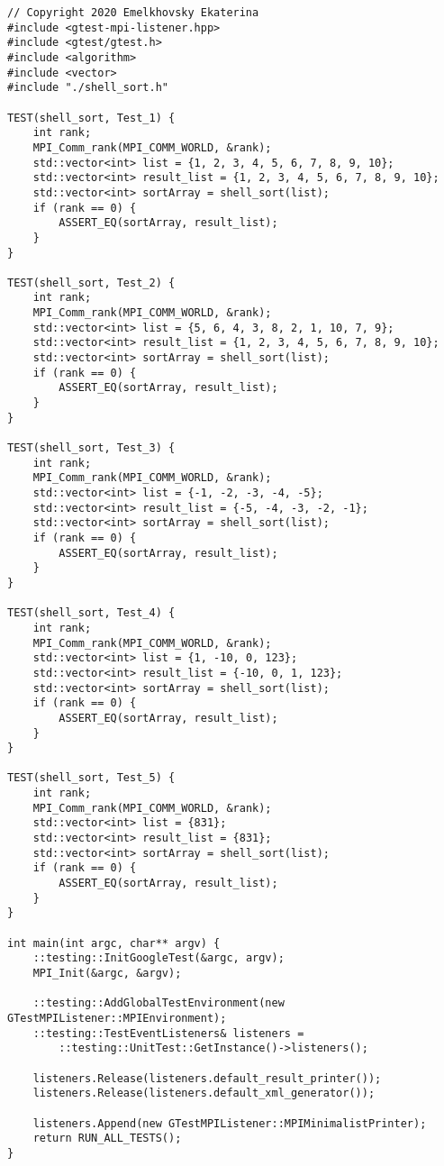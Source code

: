 \documentclass{report}
\begin{document}
\begin{lstlisting}
// Copyright 2020 Emelkhovsky Ekaterina
#include <gtest-mpi-listener.hpp>
#include <gtest/gtest.h>
#include <algorithm>
#include <vector>
#include "./shell_sort.h"

TEST(shell_sort, Test_1) {
    int rank;
    MPI_Comm_rank(MPI_COMM_WORLD, &rank);
    std::vector<int> list = {1, 2, 3, 4, 5, 6, 7, 8, 9, 10};
    std::vector<int> result_list = {1, 2, 3, 4, 5, 6, 7, 8, 9, 10};
    std::vector<int> sortArray = shell_sort(list);
    if (rank == 0) {
        ASSERT_EQ(sortArray, result_list);
    }
}

TEST(shell_sort, Test_2) {
    int rank;
    MPI_Comm_rank(MPI_COMM_WORLD, &rank);
    std::vector<int> list = {5, 6, 4, 3, 8, 2, 1, 10, 7, 9};
    std::vector<int> result_list = {1, 2, 3, 4, 5, 6, 7, 8, 9, 10};
    std::vector<int> sortArray = shell_sort(list);
    if (rank == 0) {
        ASSERT_EQ(sortArray, result_list);
    }
}

TEST(shell_sort, Test_3) {
    int rank;
    MPI_Comm_rank(MPI_COMM_WORLD, &rank);
    std::vector<int> list = {-1, -2, -3, -4, -5};
    std::vector<int> result_list = {-5, -4, -3, -2, -1};
    std::vector<int> sortArray = shell_sort(list);
    if (rank == 0) {
        ASSERT_EQ(sortArray, result_list);
    }
}

TEST(shell_sort, Test_4) {
    int rank;
    MPI_Comm_rank(MPI_COMM_WORLD, &rank);
    std::vector<int> list = {1, -10, 0, 123};
    std::vector<int> result_list = {-10, 0, 1, 123};
    std::vector<int> sortArray = shell_sort(list);
    if (rank == 0) {
        ASSERT_EQ(sortArray, result_list);
    }
}

TEST(shell_sort, Test_5) {
    int rank;
    MPI_Comm_rank(MPI_COMM_WORLD, &rank);
    std::vector<int> list = {831};
    std::vector<int> result_list = {831};
    std::vector<int> sortArray = shell_sort(list);
    if (rank == 0) {
        ASSERT_EQ(sortArray, result_list);
    }
}

int main(int argc, char** argv) {
    ::testing::InitGoogleTest(&argc, argv);
    MPI_Init(&argc, &argv);

    ::testing::AddGlobalTestEnvironment(new GTestMPIListener::MPIEnvironment);
    ::testing::TestEventListeners& listeners =
        ::testing::UnitTest::GetInstance()->listeners();

    listeners.Release(listeners.default_result_printer());
    listeners.Release(listeners.default_xml_generator());

    listeners.Append(new GTestMPIListener::MPIMinimalistPrinter);
    return RUN_ALL_TESTS();
}


\end{lstlisting}
    
\end{document}
